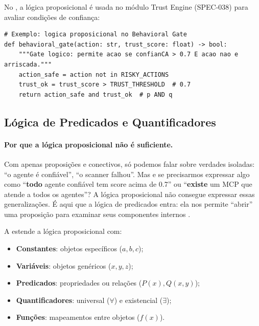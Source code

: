 \begin{exemplo}
    No \opencodeeco, a lógica proposicional é usada no módulo Trust Engine
    (SPEC-038) para avaliar condições de confiança:
    \begin{lstlisting}[style=pythonstyle]
# Exemplo: logica proposicional no Behavioral Gate
def behavioral_gate(action: str, trust_score: float) -> bool:
    """Gate logico: permite acao se confianCA > 0.7 E acao nao e arriscada."""
    action_safe = action not in RISKY_ACTIONS
    trust_ok = trust_score > TRUST_THRESHOLD  # 0.7
    return action_safe and trust_ok  # p AND q
    \end{lstlisting}
\end{exemplo}

\subsection{Lógica de Predicados e Quantificadores}

\paragraph{Por que a lógica proposicional não é suficiente.}
Com apenas proposições e conectivos, só podemos falar sobre verdades
isoladas: ``o agente é confiável'', ``o scanner falhou''. Mas e se
precisarmos expressar algo como ``\textbf{todo} agente confiável tem score
acima de 0.7'' ou ``\textbf{existe} um MCP que atende a todos os agentes''?
A lógica proposicional não consegue expressar essas generalizações. É aqui
que a lógica de predicados entra: ela nos permite ``abrir'' uma proposição
para examinar seus componentes internos \cite{russell2020inteligencia,
wooldridge2009multiagent}.

\begin{definicao}
    A  estende a lógica proposicional com:
    \begin{itemize}
        \item \textbf{Constantes}: objetos específicos ($a, b, c$);
        \item \textbf{Variáveis}: objetos genéricos ($x, y, z$);
        \item \textbf{Predicados}: propriedades ou relações ($P(x), Q(x,y)$);
        \item \textbf{Quantificadores}: universal ($\forall$) e existencial
              ($\exists$);
        \item \textbf{Funções}: mapeamentos entre objetos ($f(x)$).
    \end{itemize}
\end{definicao}

